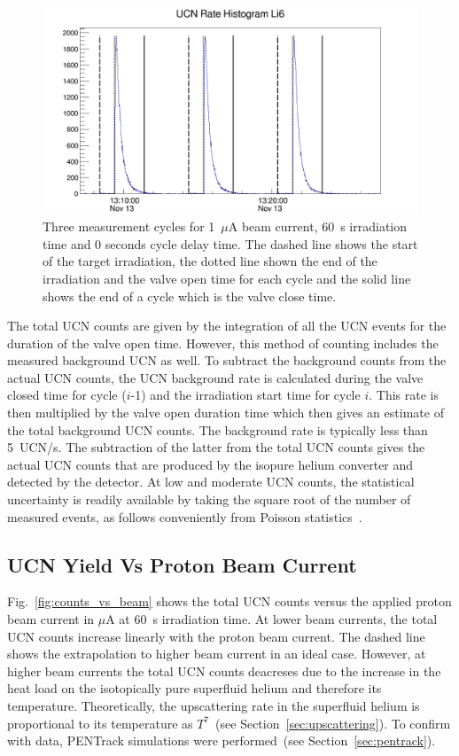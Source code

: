 \begin{figure}[h!]
  \centering
  \includegraphics[width=1.1\textwidth]{UCNRate_with_lines.png}
  \caption{Three measurement cycles for 1~$\mu$A beam current, 60~s
    irradiation time and 0 seconds cycle delay time. The dashed line
    shows the start of the target irradiation, the dotted line shown
    the end of the irradiation and the valve open time for each cycle
    and the solid line shows the end of a cycle which is the valve
    close time.}
  \label{fig:UCNRate_with_lines}
\end{figure}

The total UCN counts are given by the integration of all the UCN
events for the duration of the valve open time. However, this method
of counting includes the measured background UCN as well. To subtract
the background counts from the actual UCN counts, the UCN background
rate is calculated during the valve closed time for cycle ($i$-1) and
the irradiation start time for cycle $i$. This rate is then multiplied
by the valve open duration time which then gives an estimate of the
total background UCN counts. The background rate is typically less
than 5~UCN/s. The subtraction of the latter from the total UCN counts
gives the actual UCN counts that are produced by the isopure helium
converter and detected by the detector. At low and moderate UCN
counts, the statistical uncertainty is readily available by taking the
square root of the number of measured events, as follows conveniently
from Poisson statistics~\cite{pomme2015uncertainty}.

\subsection{UCN Yield Vs Proton Beam Current}
Fig.~\ref{fig:counts_vs_beam} shows the total UCN counts versus the
applied proton beam current in $\mu$A at 60~s irradiation time. At
lower beam currents, the total UCN counts increase linearly with the
proton beam current. The dashed line shows the extrapolation to higher
beam current in an ideal case. However, at higher beam currents the
total UCN counts deacreses due to the increase in the heat load on the
isotopically pure superfluid helium and therefore its
temperature. Theoretically, the upscattering rate in the superfluid
helium is proportional to its temperature as $T^7$~(see
Section~\ref{sec:upscattering}). To confirm with data, PENTrack
simulations were performed~(see Section~\ref{sec:pentrack}).



